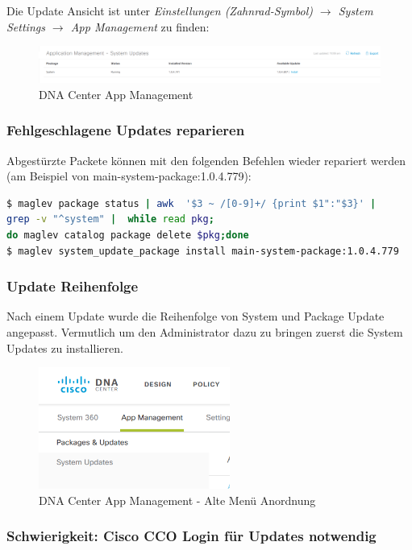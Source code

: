 Die Update Ansicht ist unter \textit{Einstellungen (Zahnrad-Symbol) $\rightarrow$ System Settings  $\rightarrow$ App Management} zu finden:

\begin{figure}[H]
	\centering
	\includegraphics[width=\columnwidth]{img/sc_009.png}
	\caption{DNA Center App Management}
	\label{fig:dna-center-gui-update-1}
\end{figure}

\subsubsection{Fehlgeschlagene Updates reparieren}
Abgestürzte Packete können mit den folgenden Befehlen wieder repariert werden (am Beispiel von main-system-package:1.0.4.779):

\begin{lstlisting}[language=bash]
$ maglev package status | awk  '$3 ~ /[0-9]+/ {print $1":"$3}' | 
grep -v "^system" |  while read pkg; 
do maglev catalog package delete $pkg;done
$ maglev system_update_package install main-system-package:1.0.4.779
\end{lstlisting}

\subsubsection{Update Reihenfolge}
Nach einem Update wurde die Reihenfolge von System und Package Update angepasst. Vermutlich um den Administrator dazu zu bringen zuerst die System Updates zu installieren. 

\begin{figure}[H]
	\centering
	\includegraphics[height=4cm]{img/sc_010.png}
	\caption{DNA Center App Management - Alte Menü Anordnung}
	\label{fig:dna-center-gui-update-2}
\end{figure}

\subsubsection{Schwierigkeit: Cisco CCO Login für Updates notwendig}

